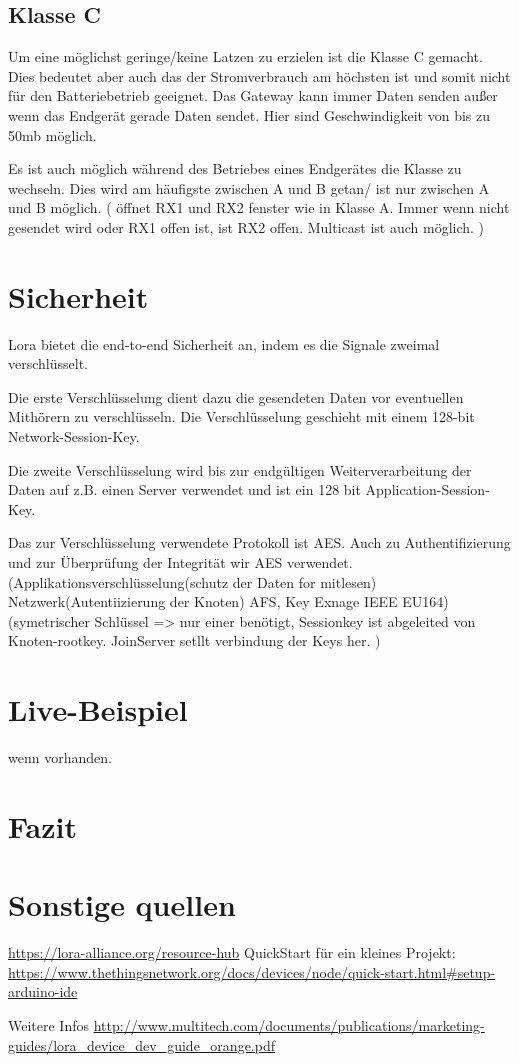 \documentclass[a4paper,12pt]{article}
\begin{document}
        \subsection{Klasse C}
            Um eine möglichst geringe/keine Latzen zu erzielen ist die Klasse C gemacht. Dies bedeutet aber auch das der Stromverbrauch am höchsten ist und somit nicht für den Batteriebetrieb geeignet.
            Das Gateway kann immer Daten senden außer wenn das Endgerät gerade Daten sendet. Hier sind Geschwindigkeit von bis zu 50mb möglich.

            Es ist auch möglich während des Betriebes eines Endgerätes die Klasse zu wechseln. Dies wird am häufigste zwischen A und B getan/ ist nur zwischen A und B möglich.
            \cite{LoRaSpec}(
                öffnet RX1 und RX2 fenster wie in Klasse A. Immer wenn  nicht gesendet wird oder RX1 offen ist, ist RX2 offen. Multicast ist auch möglich.
            )
    \section{Sicherheit} \label{sec:Sicherheit}
        Lora bietet die end-to-end Sicherheit an, indem es die Signale zweimal verschlüsselt.

        Die erste Verschlüsselung dient dazu die gesendeten Daten vor eventuellen Mithörern zu verschlüsseln. Die Verschlüsselung geschieht mit einem 128-bit Network-Session-Key.

        Die zweite Verschlüsselung wird bis zur endgültigen Weiterverarbeitung der Daten auf z.B. einen Server verwendet und ist ein 128 bit Application-Session-Key.

        Das zur Verschlüsselung verwendete Protokoll ist AES. Auch zu Authentifizierung und zur Überprüfung der Integrität wir AES verwendet.
        \cite{LoRaSecur}
            \cite{WhatIsLoRa}(Applikationsverschlüsselung(schutz der Daten for mitlesen) Netzwerk(Autentiizierung der Knoten) AFS, Key Exnage IEEE EU164)
            \cite{LoRaSpec}(symetrischer Schlüssel => nur einer benötigt, Sessionkey ist abgeleited von Knoten-rootkey. JoinServer setllt verbindung der Keys her.
            )
    \section{Live-Beispiel}
        wenn vorhanden.

    \section{Fazit}
    \section{Sonstige quellen}
        \url{https://lora-alliance.org/resource-hub}
        QuickStart für ein kleines Projekt: \url{https://www.thethingsnetwork.org/docs/devices/node/quick-start.html#setup-arduino-ide}

        Weitere Infos \url{http://www.multitech.com/documents/publications/marketing-guides/lora_device_dev_guide_orange.pdf}
        \newpage
    
    
\end{document}
